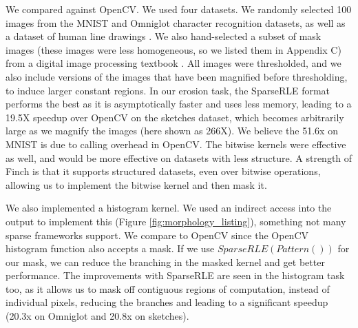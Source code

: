 We compared against OpenCV.
%
We used four datasets. We randomly selected 100 images from the MNIST \cite{lecun_gradient-based_1998} and Omniglot \cite{lake_human-level_2015} character recognition datasets, as well as a dataset of human line drawings \cite{eitz_how_2012}. 
%
We also hand-selected a subset of mask images (these images were less homogeneous, so we listed them in Appendix C) from a digital image processing textbook \cite{gonzalez_digital_2006}. 
%
All images were thresholded, and we also include versions of the images that have been magnified before thresholding, to induce larger constant regions. 
%
In our erosion task, the SparseRLE format performs the best as it is asymptotically faster and uses less memory, leading to a 19.5X speedup over OpenCV on the sketches dataset, which becomes arbitrarily large as we magnify the images (here shown as 266X). 
%
We believe the 51.6x on MNIST is due to calling overhead in OpenCV. 
%
The bitwise kernels were effective as well, and would be more effective on datasets with less structure. 
%
A strength of Finch is that it supports structured datasets, even over bitwise operations, allowing us to implement the bitwise kernel and then mask it.

We also implemented a histogram kernel.
%
We used an indirect access into the output to implement this (Figure \ref{fig:morphology_listing}), something not many sparse frameworks support.
%
We compare to OpenCV since the OpenCV histogram function also accepts a mask. 
%
If we use $SparseRLE(Pattern())$ for our mask, we can reduce the branching
in the masked kernel and get better performance.
%
The improvements with SparseRLE are seen in the histogram task too, as it allows us to mask off contiguous regions of computation, instead of individual pixels, reducing the branches and leading to a significant speedup (20.3x on Omniglot and 20.8x on sketches).
%
%

